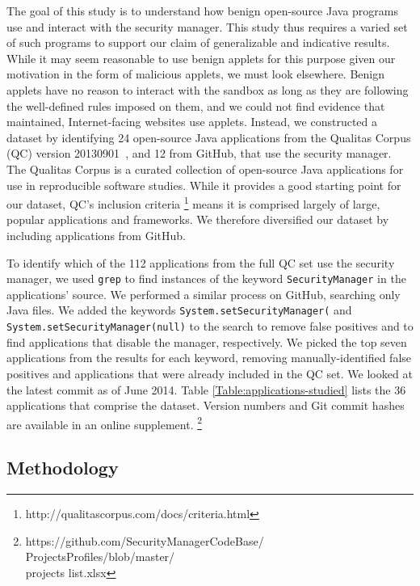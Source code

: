 \documentclass{sig-alternate}
\begin{document}
The goal of this study is to understand how benign open-source Java programs use
and interact with the security manager.  This study thus requires a varied set
of such programs to support our claim of generalizable and indicative results. While it may seem reasonable to use benign applets for this purpose given our motivation in the form of malicious applets, we must look elsewhere. Benign applets have no reason to interact with the sandbox as long as they are following the well-defined rules imposed on them, and we could not find evidence that maintained, Internet-facing websites use applets. Instead, we constructed a dataset by
identifying 24 open-source Java applications from the Qualitas Corpus
(QC) version 20130901~\cite{QualitasCorpus:APSEC:2010}, and 12 from
GitHub, that use the security manager.  The Qualitas Corpus is a curated collection of
open-source Java applications for use in reproducible software studies.  While
it provides a good starting point for our dataset,
QC's inclusion criteria%
\footnote{http://qualitascorpus.com/docs/criteria.html%
} means it is comprised largely of large, popular applications and frameworks.
We therefore diversified our dataset by including applications from GitHub. 

To identify which of the 112 applications from the full QC set use the security
manager, we used \texttt{grep} 
to find instances of the keyword \texttt{SecurityManager} in the applications'
source.  We performed a similar process on
GitHub, searching only Java files. We added the keywords
\texttt{System.setSecurityManager(} and \texttt{System.setSecurityManager(null)}
to the search to remove false positives and to find applications that disable the
manager, respectively. We picked the top seven applications from the results for each keyword,
removing manually-identified false positives and applications that were
already included in the QC set. We looked at the latest commit as of June 2014.
 Table
\ref{Table:applications-studied} lists the 36 applications that comprise the
dataset.  Version numbers
and Git commit hashes are available in an online supplement.%
\footnote{https://github.com/SecurityManagerCodeBase/\\
ProjectsProfiles/blob/master/\\
projects list.xlsx}

\subsection{Methodology}
\label{sec:methodology}
\end{document}
